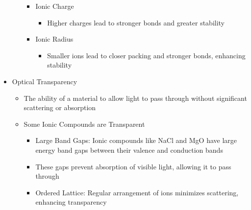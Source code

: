 \begin{itemize}
\begin{itemize}
\begin{itemize}
          \item Ionic Charge

            \begin{itemize}

              \item Higher charges lead to stronger bonds and greater stability

            \end{itemize}

          \item Ionic Radius

            \begin{itemize}

              \item Smaller ions lead to closer packing and stronger bonds, enhancing stability

            \end{itemize}

        \end{itemize}

    \end{itemize}

  \item Optical Transparency

    \begin{itemize}

      \item The ability of a material to allow light to pass through without significant scattering or absorption

      \item Some Ionic Compounds are Transparent

        \begin{itemize}

          \item Large Band Gaps: Ionic compounds like NaCl and MgO have large energy band gaps between their valence and conduction bands

          \item These gaps prevent absorption of visible light, allowing it to pass through
          
          \item Ordered Lattice: Regular arrangement of ions minimizes scattering, enhancing transparency

        \end{itemize}

    \end{itemize}


\end{itemize}
